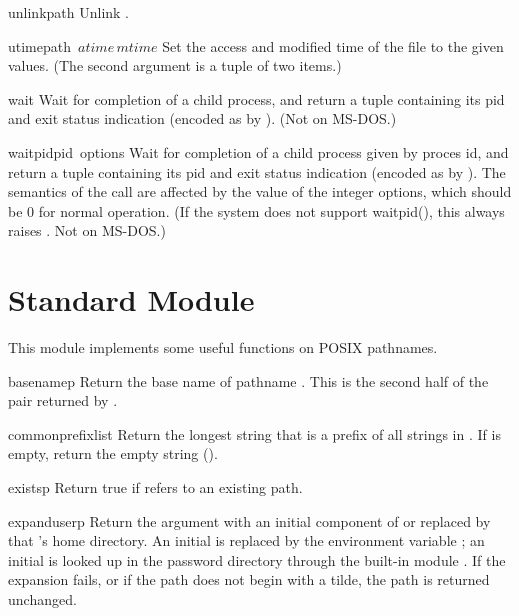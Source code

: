 \begin{funcdesc}{unlink}{path}
Unlink .
\end{funcdesc}

\begin{funcdesc}{utime}{path\, \(atime\, mtime\)}
Set the access and modified time of the file to the given values.
(The second argument is a tuple of two items.)
\end{funcdesc}

\begin{funcdesc}{wait}{}
Wait for completion of a child process, and return a tuple containing
its pid and exit status indication (encoded as by \UNIX{}).
(Not on MS-DOS.)
\end{funcdesc}

\begin{funcdesc}{waitpid}{pid\, options}
Wait for completion of a child process given by proces id, and return
a tuple containing its pid and exit status indication (encoded as by
\UNIX{}).  The semantics of the call are affected by the value of
the integer options, which should be 0 for normal operation.  (If the
system does not support waitpid(), this always raises
.  Not on MS-DOS.)
\end{funcdesc}

\section{Standard Module }

This module implements some useful functions on POSIX pathnames.

\renewcommand{\indexsubitem}{(in module posixpath)}
\begin{funcdesc}{basename}{p}
Return the base name of pathname
.
This is the second half of the pair returned by
.
\end{funcdesc}

\begin{funcdesc}{commonprefix}{list}
Return the longest string that is a prefix of all strings in
.
If
is empty, return the empty string ().
\end{funcdesc}

\begin{funcdesc}{exists}{p}
Return true if
refers to an existing path.
\end{funcdesc}

\begin{funcdesc}{expanduser}{p}
Return the argument with an initial component of \samp{\~} or
 replaced by that 's home directory.  An
initial \samp{\~{}} is replaced by the environment variable ;
an initial  is looked up in the password directory through
the built-in module .  If the expansion fails, or if the
path does not begin with a tilde, the path is returned unchanged.
\end{funcdesc}

